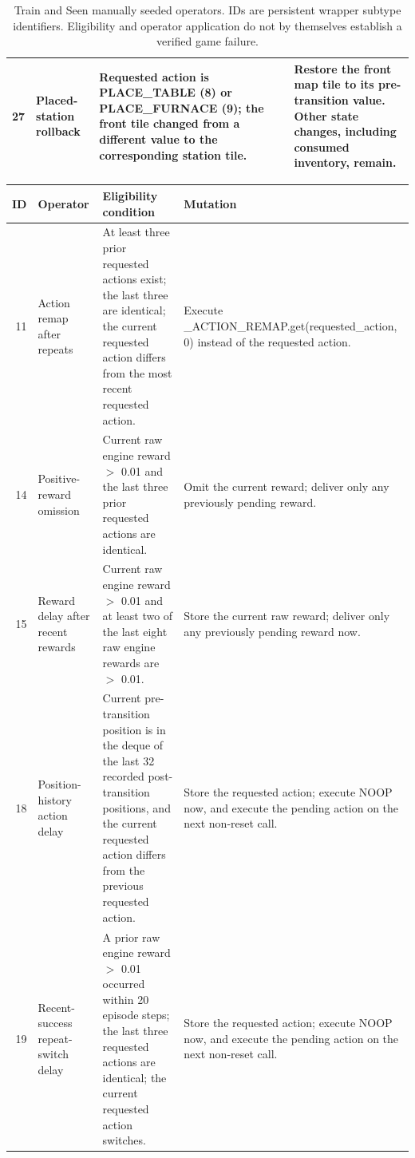 \begin{table}[t]
\begin{tabularx}{\textwidth}{@{}r p{} >{\raggedright\arraybackslash}X >{\raggedright\arraybackslash}X@{}}
27 & Placed-station rollback & Requested action is PLACE\_TABLE (8) or PLACE\_FURNACE (9); the front tile changed from a different value to the corresponding station tile. & Restore the front map tile to its pre-transition value. Other state changes, including consumed inventory, remain. \\
\bottomrule
\end{tabularx}
\caption{Train and Seen manually seeded operators. IDs are persistent wrapper subtype identifiers. Eligibility and operator application do not by themselves establish a verified game failure.}
\label{tab:tea-operators-train-seen}
\end{table}

\begin{table}[t]
\centering
\footnotesize
\setlength{\tabcolsep}{4pt}
\begin{tabularx}{\textwidth}{@{}r p{} >{\raggedright\arraybackslash}X >{\raggedright\arraybackslash}X@{}}
\toprule
ID & Operator & Eligibility condition & Mutation \\
\midrule
11 & Action remap after repeats & At least three prior requested actions exist; the last three are identical; the current requested action differs from the most recent requested action. & Execute \_ACTION\_REMAP.get(requested\_action, 0) instead of the requested action. \\
14 & Positive-reward omission & Current raw engine reward \(>\) 0.01 and the last three prior requested actions are identical. & Omit the current reward; deliver only any previously pending reward. \\
15 & Reward delay after recent rewards & Current raw engine reward \(>\) 0.01 and at least two of the last eight raw engine rewards are \(>\) 0.01. & Store the current raw reward; deliver only any previously pending reward now. \\
18 & Position-history action delay & Current pre-transition position is in the deque of the last 32 recorded post-transition positions, and the current requested action differs from the previous requested action. & Store the requested action; execute NOOP now, and execute the pending action on the next non-reset call. \\
19 & Recent-success repeat-switch delay & A prior raw engine reward \(>\) 0.01 occurred within 20 episode steps; the last three requested actions are identical; the current requested action switches. & Store the requested action; execute NOOP now, and execute the pending action on the next non-reset call. \\

\end{tabularx}
\end{table}
